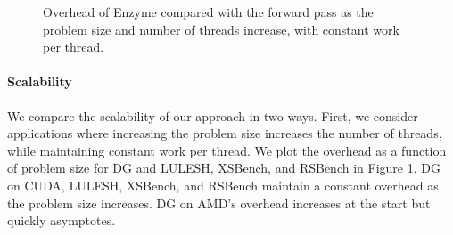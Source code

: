 
\begin{figure}
    \centering
    
    \caption{Overhead of Enzyme compared with the forward pass as the problem size and number of threads increase, with constant work per thread.}
    \label{fig:relweak}
\end{figure}


\paragraph{\textbf{Scalability}}
We compare the scalability of our approach in two ways. First, we consider applications where increasing the problem size increases the number of threads, while maintaining constant work per thread. We plot the overhead as a function of problem size for DG and LULESH, XSBench, and RSBench in Figure \ref{fig:relweak}. DG on CUDA, LULESH, XSBench, and RSBench maintain a constant overhead as the problem size increases. DG on AMD's overhead increases at the start but quickly asymptotes. 

